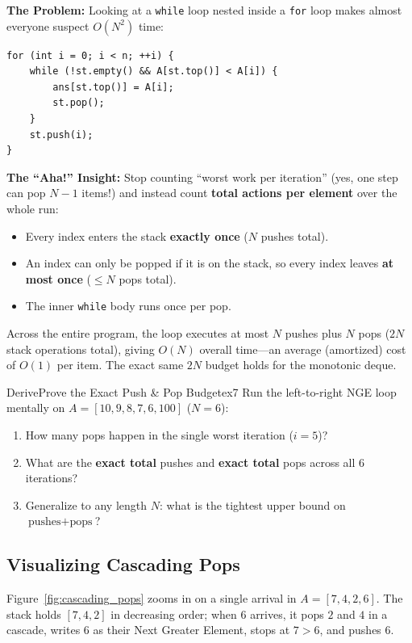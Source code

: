 \documentclass[11pt,a4paper]{article}
\theoremstyle{definition}
\newcommand{\painbeat}{\textbf{\color{accentamber}The Problem:} }
\newcommand{\ahabeat}{\textbf{\color{accentteal}The ``Aha!'' Insight:} }
\begin{document}
\painbeat Looking at a \texttt{while} loop nested inside a \texttt{for} loop makes almost everyone suspect $O(N^2)$ time:
\begin{lstlisting}[numbers=none, xleftmargin=4pt, framexleftmargin=4pt]
for (int i = 0; i < n; ++i) {
    while (!st.empty() && A[st.top()] < A[i]) {
        ans[st.top()] = A[i];
        st.pop();
    }
    st.push(i);
}
\end{lstlisting}

\ahabeat Stop counting ``worst work per iteration'' (yes, one step can pop $N - 1$ items!) and instead count \textbf{total actions per element} over the whole run:
\begin{itemize}
    \item Every index enters the stack \textbf{exactly once} ($N$ pushes total).
    \item An index can only be popped if it is on the stack, so every index leaves \textbf{at most once} ($\le N$ pops total).
    \item The inner \texttt{while} body runs once per pop.
\end{itemize}

Across the entire program, the loop executes at most $N$ pushes plus $N$ pops ($2N$ stack operations total), giving $O(N)$ overall time---an average (amortized) cost of $O(1)$ per item. The exact same $2N$ budget holds for the monotonic deque.

\begin{tryitbox}{Derive}{Prove the Exact Push \& Pop Budget}{ex7}
Run the left-to-right NGE loop mentally on $A = [10, 9, 8, 7, 6, 100]$ ($N = 6$):
\begin{enumerate}
    \item How many pops happen in the single worst iteration ($i = 5$)?
    \item What are the \textbf{exact total} pushes and \textbf{exact total} pops across all $6$ iterations?
    \item Generalize to any length $N$: what is the tightest upper bound on $\text{pushes} + \text{pops}$?
\end{enumerate}
\end{tryitbox}

\subsection{Visualizing Cascading Pops}

Figure~\ref{fig:cascading_pops} zooms in on a single arrival in $A = [7, 4, 2, 6]$. The stack holds $[7, 4, 2]$ in decreasing order; when $6$ arrives, it pops $2$ and $4$ in a cascade, writes $6$ as their Next Greater Element, stops at $7 > 6$, and pushes $6$.
\end{document}
